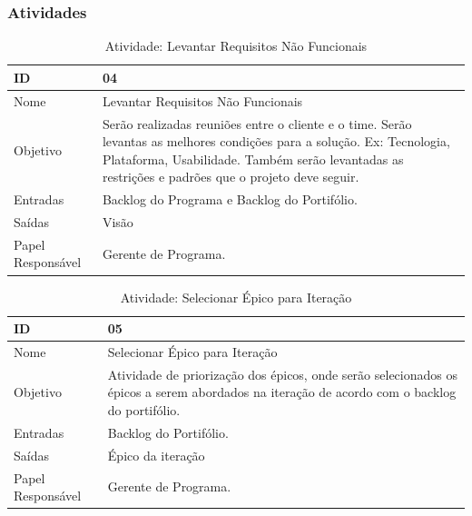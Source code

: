   \subsubsection{Atividades}

  \begin{table}[H]
    \centering
      \begin{tabular}{| m{5em} | m{10cm} |}
        \hline
        ID       & 04   \\ \hline
        Nome     & Levantar Requisitos Não Funcionais   \\ \hline
        Objetivo & Serão realizadas reuniões entre o cliente e o time. Serão levantas as melhores condições para a solução. Ex: Tecnologia, Plataforma, Usabilidade. Também serão levantadas as restrições e padrões que o projeto deve seguir. \\ \hline
        Entradas & Backlog do Programa e Backlog do Portifólio.   \\ \hline
        Saídas   & Visão \\ \hline
        Papel Responsável   & Gerente de Programa. \\ \hline
      \end{tabular}
      \caption{Atividade: Levantar Requisitos Não Funcionais}
      \label{tabela:atividade4}
  \end{table}

  \begin{table}[H]
    \centering
      \begin{tabular}{| m{5em} | m{10cm} |}
        \hline
        ID       & 05   \\ \hline
        Nome     & Selecionar Épico para Iteração   \\ \hline
        Objetivo & Atividade de priorização dos épicos, onde serão selecionados os épicos a serem abordados na iteração de acordo com o backlog do portifólio. \\ \hline
        Entradas & Backlog do Portifólio.\\ \hline
        Saídas   & Épico da iteração \\ \hline
        Papel Responsável   & Gerente de Programa. \\ \hline
      \end{tabular}
      \caption{Atividade: Selecionar Épico para Iteração}
      \label{tabela:atividade5}
  \end{table}

